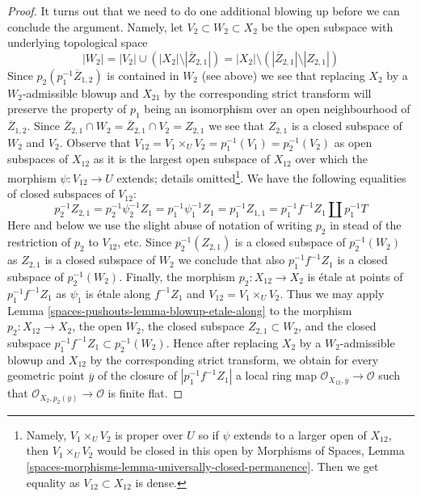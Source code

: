 \begin{proof}
\medskip\noindent
It turns out that we need to do one additional blowing up before we
can conclude the argument. Namely, let $V_2 \subset W_2 \subset X_2$
be the open subspace with underlying topological space
$$
|W_2| =
|V_2| \cup (|X_2| \setminus |\overline{Z}_{2, 1}|) =
|X_2| \setminus \left(|\overline{Z}_{2, 1}| \setminus |Z_{2, 1}|\right)
$$
Since $p_2(p_1^{-1}\overline{Z}_{1, 2})$ is contained in $W_2$ (see above)
we see that replacing $X_2$ by a $W_2$-admissible blowup and $X_{21}$
by the corresponding strict transform will preserve the property of
$p_1$ being an isomorphism over an open neighbourhood of $\overline{Z}_{1, 2}$.
Since $\overline{Z}_{2, 1} \cap W_2 = \overline{Z}_{2, 1} \cap V_2 = Z_{2, 1}$
we see that $Z_{2, 1}$ is a closed subspace of $W_2$ and $V_2$.
Observe that $V_{12} = V_1 \times_U V_2 = p_1^{-1}(V_1) = p_2^{-1}(V_2)$
as open subspaces of $X_{12}$ as it is the largest open subspace of $X_{12}$
over which the morphism $\psi : V_{12} \to U$ extends; details
omitted\footnote{Namely, $V_1 \times_U V_2$ is proper over $U$ so if
$\psi$ extends to a larger open of $X_{12}$, then $V_1 \times_U V_2$
would be closed in this open by Morphisms of Spaces, Lemma
\ref{spaces-morphisms-lemma-universally-closed-permanence}.
Then we get equality as $V_{12} \subset X_{12}$ is dense.}.
We have the following equalities of closed subspaces of $V_{12}$:
$$
p_2^{-1}Z_{2, 1} = p_2^{-1} \psi_2^{-1} Z_1 =
p_1^{-1} \psi_1^{-1} Z_1= p_1^{-1}Z_{1, 1} =
p_1^{-1}f^{-1}Z_1 \amalg p_1^{-1}T
$$
Here and below we use the slight abuse of notation of writing $p_2$ in
stead of the restriction of $p_2$ to $V_{12}$, etc.
Since $p_2^{-1}(Z_{2, 1})$ is a closed subspace of $p_2^{-1}(W_2)$
as $Z_{2, 1}$ is a closed subspace of $W_2$ we conclude that also
$p_1^{-1}f^{-1}Z_1$ is a closed subspace of $p_2^{-1}(W_2)$.
Finally, the morphism $p_2 : X_{12} \to X_2$ is \'etale at points of
$p_1^{-1}f^{-1}Z_1$ as $\psi_1$ is \'etale along $f^{-1}Z_1$
and $V_{12} = V_1 \times_U V_2$.
Thus we may apply Lemma \ref{spaces-pushouts-lemma-blowup-etale-along} to the morphism
$p_2 : X_{12} \to X_2$, the open $W_2$, the closed subspace
$Z_{2, 1} \subset W_2$, and the closed subspace
$p_1^{-1}f^{-1}Z_1 \subset p_2^{-1}(W_2)$.
Hence after replacing $X_2$ by a $W_2$-admissible blowup and $X_{12}$ by
the corresponding strict transform, we obtain for every geometric
point $\overline{y}$ of the closure of $|p_1^{-1}f^{-1}Z_1|$ a local ring map
$\mathcal{O}_{X_{12}, \overline{y}} \to \mathcal{O}$ such that
$\mathcal{O}_{X_2, p_2(\overline{y})} \to \mathcal{O}$ is finite flat.


\end{proof}
